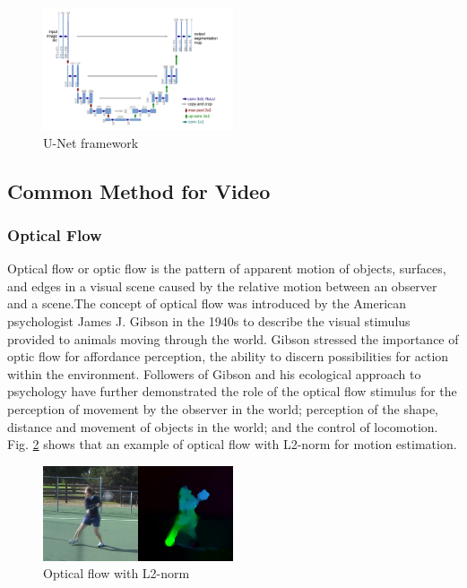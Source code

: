 \begin{figure}[ht]
    \centering
    \includegraphics[width=0.5\textwidth]{./figure/unet.png}
    \caption{U-Net framework}
    \label{unet}
\end{figure}

\subsection{Common Method for Video}

\subsubsection{Optical Flow}
Optical flow or optic flow is the pattern of apparent motion of objects, surfaces, and edges in a visual scene caused by the relative motion between an observer and a scene.The concept of optical flow was introduced by the American psychologist James J. Gibson in the 1940s to describe the visual stimulus provided to animals moving through the world.\cite{OpticalFlow} Gibson stressed the importance of optic flow for affordance perception, the ability to discern possibilities for action within the environment. Followers of Gibson and his ecological approach to psychology have further demonstrated the role of the optical flow stimulus for the perception of movement by the observer in the world; perception of the shape, distance and movement of objects in the world; and the control of locomotion. Fig. \ref{optical flow} shows that an example of optical flow with L2-norm for motion estimation. 

\begin{figure}[ht]
    \centering
    \includegraphics[width=0.5\textwidth]{./figure/opticalflow.png}
    \caption{Optical flow with L2-norm}
    \label{optical flow}
\end{figure}

